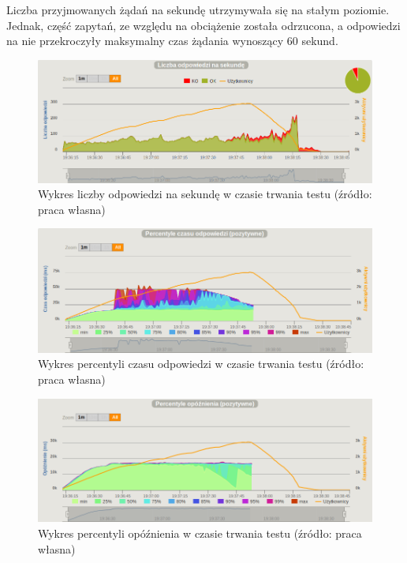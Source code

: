 \documentclass[12pt,twoside]{article}
\begin{document}
Liczba przyjmowanych żądań na sekundę utrzymywała się na stałym
poziomie. Jednak, część zapytań, ze względu na obciążenie została
odrzucona, a odpowiedzi na nie przekroczyły maksymalny czas żądania
wynoszący 60 sekund.

\begin{figure}[htbp]
\centering
\includegraphics[resolution=150]{test_results/elixir/matrix/screenshots/responses.png}
\caption{Wykres liczby odpowiedzi na sekundę w czasie trwania testu (źródło: praca własna)}
\end{figure}

\begin{figure}[htbp]
\centering
\includegraphics[resolution=150]{test_results/elixir/matrix/screenshots/response_percentile.png}
\caption{Wykres percentyli czasu odpowiedzi w czasie trwania testu (źródło: praca własna)}
\end{figure}

\begin{figure}[htbp]
\centering
\includegraphics[resolution=150]{test_results/elixir/matrix/screenshots/latency_percentile.png}
\caption{Wykres percentyli opóźnienia w czasie trwania testu (źródło: praca własna)}
\end{figure}
\end{document}
